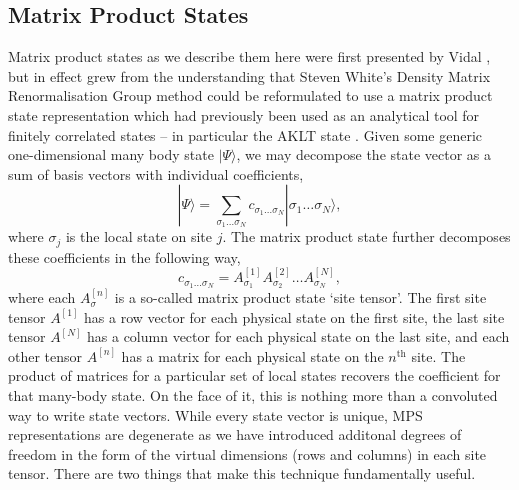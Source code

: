  \subsection{Matrix Product States}
 Matrix product states as we describe them here were first presented by Vidal \cite{Vidal04}, but in effect grew from the understanding that Steven White's Density Matrix Renormalisation Group method \cite{White92,White93} could be reformulated to use a matrix product state representation which had previously been used as an analytical tool for finitely correlated states -- in particular the AKLT state \cite{AKLT87}.
 Given some generic one-dimensional many body state \(|\Psi \rangle\), we may decompose the state vector as a sum of basis vectors with individual coefficients,
 \begin{equation}
 	|\Psi \rangle = \sum_{\sigma_{1} \ldots \sigma_{N}} c_{\sigma_{1} \ldots \sigma_{N}}| \sigma_{1} \ldots \sigma_{N} \rangle,
 	\label{eq:mps1-1}
 \end{equation}
 where \(\sigma_{j}\) is the local state on site \(j\). The matrix product state further decomposes these coefficients in the following way, 
 \begin{equation}
 	c_{\sigma_{1} \ldots \sigma_{N}} = A^{[1]}_{\sigma_{1}} A^{[2]}_{\sigma_{2}} \ldots A^{[N]}_{\sigma_{N}},
 	\label{eq:mps1-2}
 \end{equation}
 where each \(A^{[n]}_{\sigma}\) is a so-called matrix product state `site tensor'. The first site tensor \(A^{[1]}\) has a row vector for each physical state on the first site, the last site tensor \(A^{[N]}\) has a column vector for each physical state on the last site, and each other tensor \(A^{[n]}\) has a matrix for each physical state on the \(n^{\mathrm{th}}\) site. The product of matrices for a particular set of local states recovers the coefficient for that many-body state. On the face of it, this is nothing more than a convoluted way to write state vectors. While every state vector is unique, MPS representations are degenerate as we have introduced additonal degrees of freedom in the form of the virtual dimensions (rows and columns) in each site tensor. There are two things that make this technique fundamentally useful. 
 
